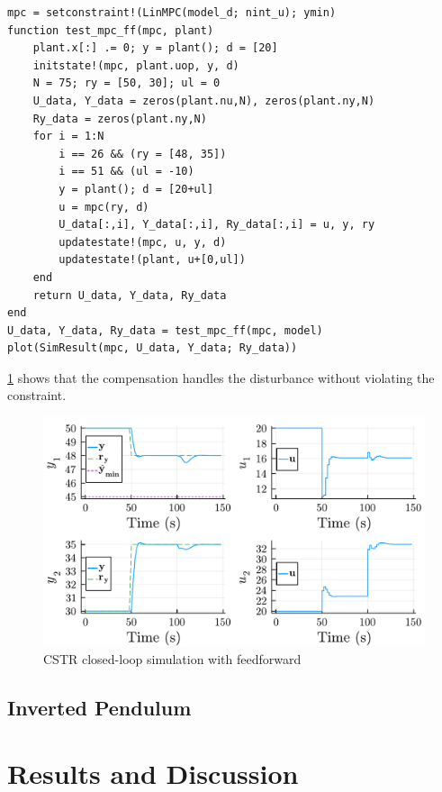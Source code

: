 \begin{verbatim}
mpc = setconstraint!(LinMPC(model_d; nint_u); ymin)
function test_mpc_ff(mpc, plant)
    plant.x[:] .= 0; y = plant(); d = [20]
    initstate!(mpc, plant.uop, y, d)
    N = 75; ry = [50, 30]; ul = 0
    U_data, Y_data = zeros(plant.nu,N), zeros(plant.ny,N)
    Ry_data = zeros(plant.ny,N)
    for i = 1:N
        i == 26 && (ry = [48, 35])
        i == 51 && (ul = -10)
        y = plant(); d = [20+ul]
        u = mpc(ry, d)
        U_data[:,i], Y_data[:,i], Ry_data[:,i] = u, y, ry
        updatestate!(mpc, u, y, d) 
        updatestate!(plant, u+[0,ul])
    end
    return U_data, Y_data, Ry_data
end
U_data, Y_data, Ry_data = test_mpc_ff(mpc, model)
plot(SimResult(mpc, U_data, Y_data; Ry_data))
\end{verbatim}

\cref{fig:plot2_LinMPC} shows that the compensation handles the disturbance without violating the constraint.

\begin{figure}
    \centering
    \includegraphics[width=\columnwidth]{fig/plot2_LinMPC.pdf}
    \caption{CSTR closed-loop simulation with feedforward}
    \label{fig:plot2_LinMPC}
\end{figure}

\subsection{Inverted Pendulum}



\section{Results and Discussion}
\label{sec.results_simple}

